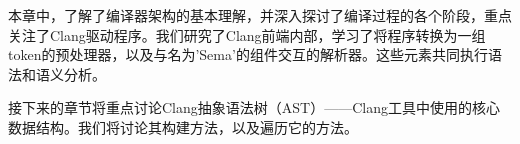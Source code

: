 本章中，了解了编译器架构的基本理解，并深入探讨了编译过程的各个阶段，重点关注了Clang驱动程序。我们研究了Clang前端内部，学习了将程序转换为一组token的预处理器，以及与名为'Sema'的组件交互的解析器。这些元素共同执行语法和语义分析。

接下来的章节将重点讨论Clang抽象语法树（AST）——Clang工具中使用的核心数据结构。我们将讨论其构建方法，以及遍历它的方法。

